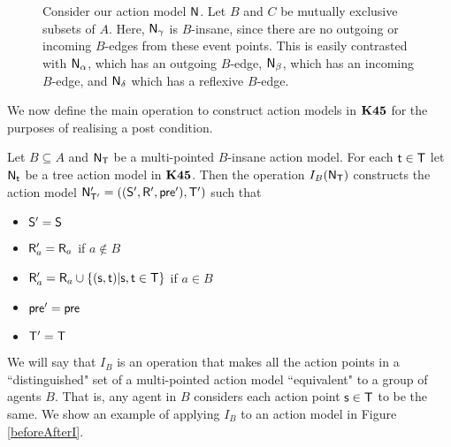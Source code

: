 \begin{figure}
\centering
{}
\caption[$B$-insane action models]{Consider our action model $\mathrm{\mathsf{N}}$. Let $B$ and $C$ be mutually exclusive
  subsets of $A$. Here, $\mathrm{\mathsf{N}}_\gamma$
  is $B$-insane, since there are no outgoing or incoming $B$-edges from these event points.
This is easily contrasted with $\mathrm{\mathsf{N}}_\alpha$, which has an outgoing $B$-edge, $\mathrm{\mathsf{N}}_\beta$, which
has an incoming $B$-edge, and $\mathrm{\mathsf{N}}_\delta$ which has a reflexive $B$-edge.}
\label{bInsaneExample}
\end{figure}

We now define the main operation to construct action models in $\bf K45$ for the
purposes of realising a post condition.

\begin{defn} \label{makeEquivalence}
	Let $B \subseteq A$ and $\mathrm{\mathsf{N}}_\mathrm{\mathsf{T}}$ be a multi-pointed $B$-insane action model.
  For each $\mathrm{\mathsf{t}} \in \mathrm{\mathsf{T}}$ let $\mathrm{\mathsf{N}}_\mathrm{\mathsf{t}}$ be a tree action model in $\bf K45$.
  Then the operation $I_B(\mathrm{\mathsf{N}}_\mathrm{\mathsf{T}})$ constructs the action model $\mathrm{\mathsf{N}}'_{\mathrm{\mathsf{T}}'} =
  ((\mathrm{\mathsf{S}}',\mathrm{\mathsf{R}}',\mathrm{\mathsf{pre}}'),\mathrm{\mathsf{T}}')$ such that
  \begin{itemize}
    \item $\mathrm{\mathsf{S}}' = \mathrm{\mathsf{S}}$
    \item $\mathrm{\mathsf{R}}'_a = \mathrm{\mathsf{R}}_a$ if $a \notin B$
    \item $\mathrm{\mathsf{R}}'_a = \mathrm{\mathsf{R}}_a \cup \{(\mathrm{\mathsf{s}}, \mathrm{\mathsf{t}}) | \mathrm{\mathsf{s}}, \mathrm{\mathsf{t}} \in \mathrm{\mathsf{T}}\}$ if $a
    \in B$
    \item $\mathrm{\mathsf{pre}}' = \mathrm{\mathsf{pre}}$
    \item $\mathrm{\mathsf{T}}' = \mathrm{\mathsf{T}}$
  \end{itemize}
\end{defn}

We will say that $I_B$ is an operation that makes all the action
points in a ``distinguished" set of a multi-pointed action model ``equivalent" to a
group of agents $B$.
That is, any agent in $B$ considers each action point $\mathrm{\mathsf{s}} \in \mathrm{\mathsf{T}}$ to be the
same.
We show an example of applying $I_B$ to an action model in Figure \ref{beforeAfterI}.

